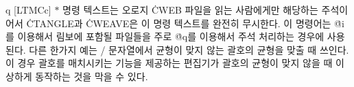 \@{q} [LTMCc] $*$ 명령 텍스트는 오로지
\.{CWEB} 파일을 읽는 사람에게만 해당하는 주석이어서 \.{CTANGLE}과
\.{CWEAVE}은 이 명령 텍스트를 완전히 무시한다.
이 명령어는 \.{@i}를 이용해서 림보에 포함될 파일들을 주로 \.{@q}를
이용해서 주석 처리하는 경우에 사용된다. 다른 한가지 예는 \CEE/
문자열에서 균형이 맞지 않는 괄호의 균형을 맞출 때 쓰인다. 이 경우 괄호를
매치시키는 기능을 제공하는 편집기가 괄호의 균형이 맞지 않을 때 이상하게
동작하는 것을 막을 수 있다. 
 
